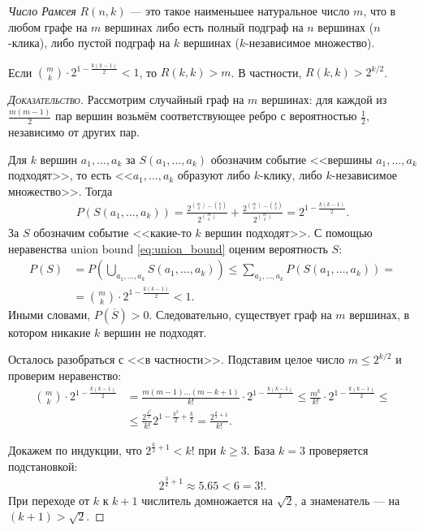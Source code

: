 \documentclass[../main.tex]{subfiles}
\begin{document}
\begin{df}
 \textit{Число Рамсея} $R(n,k)$  --- это такое наименьшее натуральное число $m$, что в любом графе на $m$ вершинах либо есть полный подграф на $n$ вершинах ($n$-клика), либо пустой подграф на $k$ вершинах ($k$-независимое множество).
\end{df}
\begin{thm}[Эрдёша]
 Если $\binom m k \cdot 2^{1 - \frac{k(k-1)}{2}} < 1$, то $R(k,k) > m$. В частности, $R(k,k) > 2^{k / 2}$.
\end{thm}
\begin{proof}[\normalfont\textsc{Доказательство}]
 Рассмотрим случайный граф на $m$  вершинах: для каждой из $\frac{m(m-1)}{2}$ пар вершин возьмём соответствующее ребро с вероятностью $\frac{1}{2}$, независимо от других пар. 

 Для $ k $ вершин $ a_1, \ldots, a_k $ за $ S(a_1, \ldots, a_k) $ обозначим событие <<вершины $ a_1,\ldots,a_k $ подходят>>, то есть <<$ a_1,\ldots,a_k $ образуют либо $ k $-клику, либо $ k $-независимое множество>>. Тогда
 \begin{align*}
  P(S(a_1,\ldots,a_k)) =  \frac{2^{\binom m 2 - \binom k 2}}{2^{\binom m 2}} + \frac{2^{\binom m 2 - \binom k 2}}{2^{\binom m 2}} =  2^{1-\frac{k(k-1)}{2}}.
 \end{align*} За $ S  $ обозначим событие <<какие-то $ k $ вершин подходят>>. С помощью неравенства union bound \eqref{eq:union_bound} оценим вероятность $ S $:
 \begin{align*}
  P(S) &= P \left( \bigcup_{a_1, \ldots, a_k} S(a_1, \ldots, a_k) \right) \leqslant \sum_{a_1, \ldots, a_k}  P(S(a_1,\ldots,a_k)) = \\
  &= \binom m k \cdot 2^{1 - \frac{k(k-1)}{2}} < 1.
 \end{align*} Иными словами, $ P(\overline S) > 0 $. Следовательно, существует граф на $ m $ вершинах, в котором никакие $k$  вершин не подходят.

 Осталось разобраться с <<в частности>>. Подставим целое число $m \leqslant 2^{k / 2}$ и проверим неравенство:
 \begin{align*}
  \binom m k \cdot 2^{1 - \frac{k(k-1)}{2}} &= \frac{m (m-1) \ldots (m - k + 1)}{k!} \cdot 2^{1 - \frac{k(k-1)}{2}} \leqslant \frac{m^{k}}{k!} \cdot 2^{1-\frac{k(k-1)}{2}} \leqslant \\
  &\leqslant \frac{2^{\frac{k^{2}}{2}}}{k!}2^{1 - \frac{k^{2}}{2} + \frac{k}{2}} = \frac{2^{\frac{k}{2} + 1}}{k!}.
 \end{align*}

 Докажем по индукции, что $2^{\frac{k}{2} + 1} < k!$ при $k \geqslant 3$. База $k = 3$ проверяется подстановкой:
 \begin{align*}
  2^{\frac{3}{2} + 1} \approx 5.65 < 6 = 3!.
 \end{align*} При переходе от $k$ к $k + 1$ числитель домножается  на $\sqrt 2$, а знаменатель --- на $(k + 1) > \sqrt 2$.
\end{proof}
\end{document}
